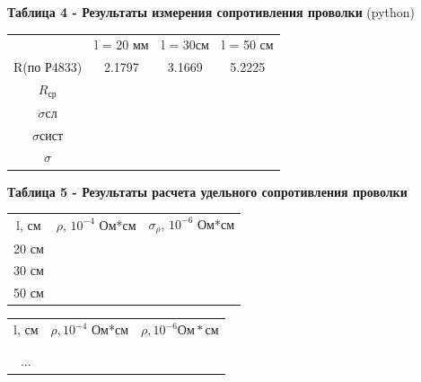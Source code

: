 \documentclass[12pt]{extarticle}
\begin{document}
\newpage 

\textbf{\large Таблица 4 - Результаты измерения сопротивления проволки} (python)

\vspace{5mm}

\begin{tabular}{cccc}
     & l = 20 мм& l = 30см & l = 50 см\\
    R(по Р4833) & 2.1797 & 3.1669 & 5.2225\\
    $R_{\text{ср}}$& & &\\
    $\sigma{\text{сл}}$& & &\\
    $\sigma{\text{сист}}$& & &\\
    $\sigma$& & &\\

\end{tabular}

\textbf{\large Таблица 5 - Результаты расчета удельного сопротивления проволки}

\vspace{5mm}

\begin{tabular}{ccc}
    l, см & $\rho$, $10^{-4}$ Ом*см & $\sigma_{\rho}$, $10^{-6}$ Ом*см\\
    20 см & & \\
    30 см & &\\
    50 см& &\\

\end{tabular}

\begin{tabular}{ccc}
    l, см & $\rho, 10^{-4}$ Ом*см& $\rho, 10^{-6} Ом*см$ \\
     & &\\
     & & \\
    ...\\
\end{tabular}
\end{document}
